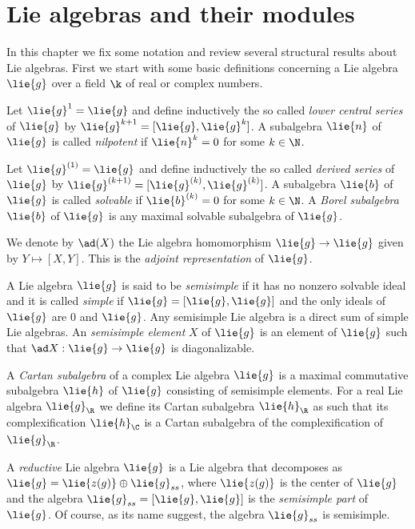 \chapter{Lie algebras and their modules}

In this chapter we fix some notation and review several structural results about Lie algebras. First we start with some basic definitions concerning a Lie algebra $\lie{g}$ over a field $\k$ of real or complex numbers.

\medskip


Let $\lie{g}^{1} = \lie{g}$ and define inductively the so called \emph{lower central series} of $\lie{g}$ by $\lie{g}^{k+1} = [\lie{g},\lie{g}^{k}]$.  A subalgebra $\lie{n}$ of $\lie{g}$ is called \emph{nilpotent} if $\lie{n}^{k} = 0$ for some $k\in\N$.

Let $\lie{g}^{(1)} = \lie{g}$ and define inductively the so called \emph{derived series} of $\lie{g}$ by $\lie{g}^{(k+1)} = [\lie{g}^{(k)},\lie{g}^{(k)}]$.  A subalgebra $\lie{b}$ of $\lie{g}$ is called \emph{solvable} if $\lie{b}^{(k)} = 0$ for some $k\in\N$. A \emph{Borel subalgebra} $\lie{b}$ of $\lie{g}$ is any maximal solvable subalgebra of $\lie{g}$.


We denote by $\ad(X)$ the Lie algebra homomorphism $\lie{g}\to \lie{g}$ given by $Y\mapsto [X,Y]$. This is the \emph{adjoint representation} of $\lie{g}$.

A  Lie algebra $\lie{g}$ is said to be \emph{semisimple} if it has no nonzero solvable ideal and it is called \emph{simple} if $\lie{g} = [\lie{g},\lie{g}]$ and the only ideals of $\lie{g}$ are $0$ and $\lie{g}$. Any semisimple Lie algebra is a direct sum of simple Lie algebras. An \emph{semisimple element} $X$ of $\lie{g}$ is an element of $\lie{g}$ such that $\ad X: \lie{g} \to \lie{g}$ is diagonalizable.

A \emph{Cartan subalgebra} of a complex Lie algebra $\lie{g}$ is a maximal commutative subalgebra $\lie{h}$ of $\lie{g}$ consisting of semisimple elements. For a real Lie algebra $\lie{g}_\R$ we define its Cartan subalgebra $\lie{h}_\R$ as such that its complexification $\lie{h}_\C$ is a Cartan subalgebra of the complexification of $\lie{g}_\R$.

A \emph{reductive} Lie algebra $\lie{g}$ is a Lie algebra that decomposes as $\lie{g} = \lie{z(g)} \oplus \lie{g}_{ss}$, where $\lie{z(g)}$ is the center of $\lie{g}$ and the algebra $\lie{g}_{ss} = [\lie{g},\lie{g}]$ is the \emph{semisimple part} of $\lie{g}$. Of course, as its name suggest, the algebra $\lie{g}_{ss}$ is semisimple.


